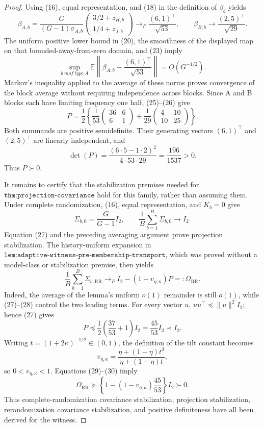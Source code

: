 \documentclass{article}
\begin{document}
\begin{proof}
Using (16), equal representation, and (18) in the definition of \(\beta_b\) yields
\[
\beta_{A,b}
=\frac{G}{(G-1)\sigma_{A,b}}
  \begin{pmatrix}3/2+z_{H,b}\\[2pt]1/4+z_{J,b}\end{pmatrix}
\longrightarrow_P\frac{(6,1)^\top}{\sqrt{53}},
\qquad
\beta_{B,b}\longrightarrow\frac{(2,5)^\top}{\sqrt{29}}. \tag{25}
\]
The uniform positive lower bound in (20), the smoothness of the displayed map on that bounded-away-from-zero domain, and (23) imply
\[
\sup_{b\ {
m of\ type\ A}}
\mathbb E\left\|\beta_{A,b}-\frac{(6,1)^\top}{\sqrt{53}}\right\|
=O(G^{-1/2}).                                               \tag{26}
\]
Markov's inequality applied to the average of these norms proves convergence of the block average without requiring independence across blocks.  Since A and B blocks each have limiting frequency one half, (25)--(26) give
\[
P=\frac12\left\{
\frac1{53}\begin{pmatrix}36&6\\6&1\end{pmatrix}
+\frac1{29}\begin{pmatrix}4&10\\10&25\end{pmatrix}
\right\}.                                                  \tag{27}
\]
Both summands are positive semidefinite.  Their generating vectors \((6,1)^\top\) and \((2,5)^\top\) are linearly independent, and
\[
\det(P)=\frac{(6\cdot5-1\cdot2)^2}{4\cdot53\cdot29}
=\frac{196}{1537}>0.
\]
Thus \(P\succ0\).

It remains to certify that the stabilization premises needed for \(\texttt{thm:projection-covariance}\) hold for this family, rather than assuming them.  Under complete randomization, (16), equal representation, and \(K_b=0\) give
\[
\Sigma_{b,0}=\frac G{G-1}I_2,
\qquad
\frac1B\sum_{b=1}^B\Sigma_{b,0}\longrightarrow I_2.     \tag{28}
\]
Equation (27) and the preceding averaging argument prove projection stabilization.  The history-uniform expansion in \(\texttt{lem:adaptive-witness-pre-membership-transport}\), which was proved without a model-class or stabilization premise, then yields
\[
\frac1B\sum_{b=1}^B\Sigma_{b,\mathrm{RR}}
\longrightarrow_P I_2-(1-v_{\eta,\kappa})P
=:\Omega_{\mathrm{RR}}.                                  \tag{29}
\]
Indeed, the average of the lemma's uniform \(o(1)\) remainder is still \(o(1)\), while (27)--(28) control the two leading terms.  For every vector \(u\), \(uu^\top\preceq\|u\|^2I_2\); hence (27) gives
\[
P\preceq\frac12\left(\frac{37}{53}+1\right)I_2
=\frac{45}{53}I_2\prec I_2.                              \tag{30}
\]
Writing \(t=(1+2\kappa)^{-1/2}\in(0,1)\), the definition of the tilt constant becomes
\[
v_{\eta,\kappa}=\frac{\eta+(1-\eta)t^3}{\eta+(1-\eta)t},
\]
so \(0<v_{\eta,\kappa}<1\).  Equations (29)--(30) imply
\[
\Omega_{\mathrm{RR}}
\succeq\left\{1-(1-v_{\eta,\kappa})\frac{45}{53}\right\}I_2
\succ0.                                                    \tag{31}
\]
Thus complete-randomization covariance stabilization, projection stabilization, rerandomization covariance stabilization, and positive definiteness have all been derived for the witness.


\end{proof}
\end{document}

